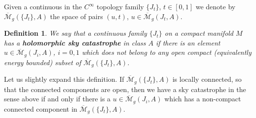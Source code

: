 \documentclass{amsart}
\numberwithin{equation}{section}
\newtheorem{definition}[equation]{Definition}
\theoremstyle{definition}
\theoremstyle{remark}
\begin{document}
   Given a continuous in the $C ^{\infty} $ topology family $\{J _{t} \}$, $t \in [0,1]$ we denote by $\overline{\mathcal{M}} _{g}
   (\{J _{t} \}, A)$ the space of pairs $(u,t)$, $u \in \overline{\mathcal{M}} _{g}(J _{t}, A)$.
\begin{definition} We say that a continuous family  $\{J _{t}
   \}$ on a compact manifold $M$ has a \textbf{\emph{holomorphic sky catastrophe}} in class
   $A$ if 
there is an element $u \in \overline{\mathcal{M}} _{g} (J _{i}, A)   $, $i=0,1$
which does not belong to any open compact (equivalently energy bounded) subset of $\overline{\mathcal{M}} _{g}
   (\{J _{t} \}, A)$. 
\end{definition} 
Let us slightly expand this definition. If $\overline{\mathcal{M}} _{g}
   (\{J _{t} \}, A)$ is locally connected, so that the connected components 
are open, then we have a sky catastrophe in the sense above if and only if there is a $u \in \overline{\mathcal{M}} _{g} (J _{i}, A)   $ which has a non-compact connected component in $\overline{\mathcal{M}} _{g}
   (\{J _{t} \}, A)$.
\end{document}
